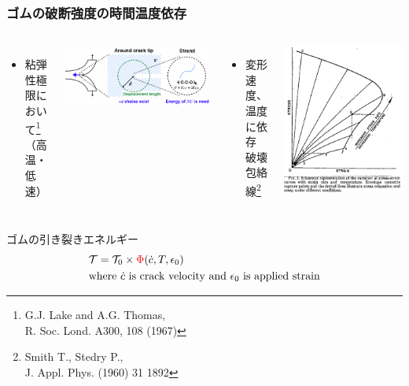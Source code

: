 \documentclass[12pt, dvipdfmx]{beamer}
\begin{document}
\begin{frame}
    \frametitle{ゴムの破断強度の時間温度依存}
	\vspace{-2mm}
    \begin{columns}[T, totalwidth=\textwidth]
    \begin{itemize}
		\item \alert{粘弾性極限において\footnote[1]{
			G.J. Lake and A.G. Thomas, \\R. Soc. Lond. A300, 108 (1967)
		}}\\
		（高温・低速）
	\end{itemize}
    \includegraphics[width=\textwidth]{Lake_Thomas.png}
    
    \begin{itemize}
		\item 変形速度、温度に依存\\
		\alert{破壊包絡線\footnote[2]{
			Smith T., Stedry P., \\J. Appl. Phys. (1960) 31 1892
		}}
	\end{itemize}
	\begin{center}
		\includegraphics[width=.4\textwidth]{Time_Temp_3.png}
	\end{center}
    \end{columns}
    \begin{alertblock}{ゴムの引き裂きエネルギー}
		\vspace{-2mm}
		\begin{align*}
			&\mathcal{T}=\mathcal{T}_0 \times {\color{red}\Phi}(\dot{c}, T, \epsilon_0) \\
			&\text{where $\dot{c}$ is crack velocity and $\epsilon_0$ is applied strain}
		\end{align*}
    \end{alertblock}
\end{frame}
\end{document}
